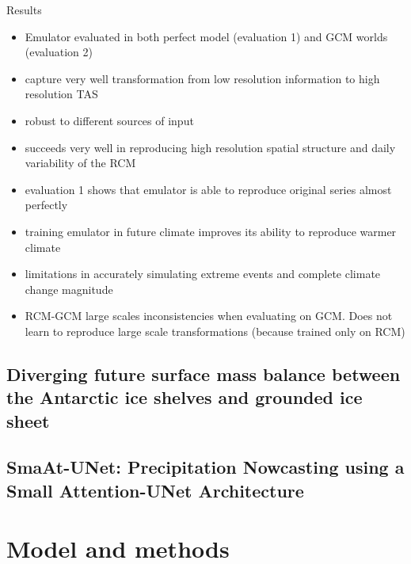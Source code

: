 \documentclass[a4paper,11pt,oneside]{report}
\begin{document}
Results
\begin{itemize}
    \item Emulator evaluated in both perfect model (evaluation 1) and GCM worlds (evaluation 2)
    \item capture very well transformation from low resolution information to high resolution TAS
    \item robust to different sources of input
    \item succeeds very well in reproducing high resolution spatial structure and daily variability of the RCM
    \item evaluation 1 shows that emulator is able to reproduce original series almost perfectly
    \item training emulator in future climate improves its ability to reproduce warmer climate
    \item limitations in accurately simulating extreme events and complete climate change magnitude
    \item RCM-GCM large scales inconsistencies when evaluating on GCM. Does not learn to reproduce large scale transformations (because trained only on RCM)
\end{itemize}
\section{Diverging future surface mass balance between the Antarctic ice shelves and grounded ice sheet \cite{Kittel}}

\section{SmaAt-UNet: Precipitation Nowcasting using a Small Attention-UNet Architecture~\cite{smatunet}}


\chapter{Model and methods}


\end{document}
